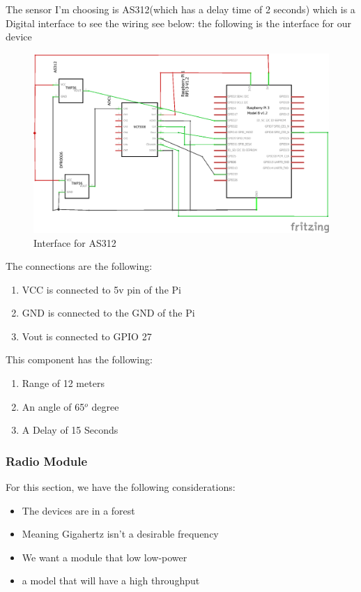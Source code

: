 The sensor I'm choosing is AS312\cite{micros}(which has a delay time of 2 seconds) which is a Digital interface to see the wiring see below:
\newpage
the following is the interface for our device

\begin{figure}[h!]
	\begin{center}
		\includegraphics[width=0.5\linewidth]{Images/interfaceofAS312.png}
	\caption{Interface for AS312}
	\label{Interface for AS312}
	\end{center}

\end{figure}

The connections are the following:
\begin{enumerate}
	\item VCC is connected  to 5v pin of the Pi
	\item GND is connected to the GND of the  Pi
	\item Vout is connected to GPIO 27
\end{enumerate}
This  component has the following:
\begin{enumerate}
	\item Range  of 12 meters 
	\item An  angle  of  65$^o$ degree
	\item A Delay of 15 \mu Seconds
\end{enumerate}

\subsubsection{Radio Module}
For this section, we have the following considerations:
\begin{itemize}
	\item The devices are in a forest
	\item Meaning  Gigahertz  isn't  a desirable frequency
	\item We want a module that low low-power
	\item a model that  will have a high throughput 
\end{itemize}

